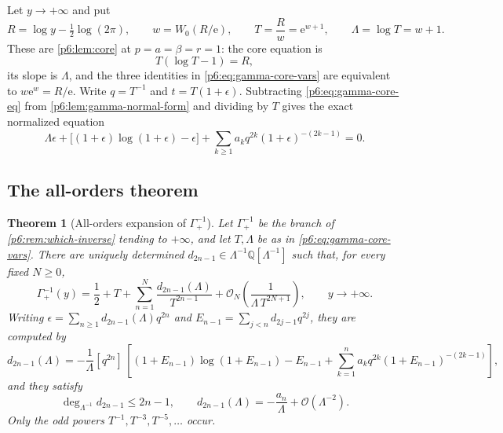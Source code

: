 \documentclass[11pt,a4paper,oneside]{book}
\theoremstyle{plain}
\newtheorem{theorem}{Theorem}[chapter]
\theoremstyle{definition}
\theoremstyle{remark}
\newcommand{\Rat}{\mathbb{Q}}
\newcommand{\e}{\mathrm{e}}
\newcommand{\Coef}[1]{[#1]\,}
\newcommand{\bigO}{\mathcal{O}}
\newcommand{\Wlam}{W}
\begin{document}
Let $y\to+\infty$ and put
\begin{equation}\label{p6:eq:gamma-core-vars}
 R=\log y-\tfrac12\log(2\pi),
 \qquad
 w=\Wlam_0(R/\e),
 \qquad
 T=\frac Rw=\e^{w+1},
 \qquad
 \Lambda=\log T=w+1 .
\end{equation}
These are \cref{p6:lem:core} at $p=a=\beta=r=1$: the core equation is
\begin{equation}\label{p6:eq:gamma-core-eq}
 T(\log T-1)=R,
\end{equation}
its slope is $\Lambda$, and the three identities in
\eqref{p6:eq:gamma-core-vars} are equivalent to $w\e^{w}=R/\e$.  Write
$q=T^{-1}$ and $t=T(1+\epsilon)$.  Subtracting \eqref{p6:eq:gamma-core-eq}
from \cref{p6:lem:gamma-normal-form} and dividing by $T$ gives the exact
normalized equation
\begin{equation}\label{p6:eq:gamma-normalized}
 \Lambda\epsilon+\bigl[(1+\epsilon)\log(1+\epsilon)-\epsilon\bigr]
 +\sum_{k\ge1}a_kq^{2k}(1+\epsilon)^{-(2k-1)}=0 .
\end{equation}

\subsection{The all-orders theorem}

\begin{theorem}[All-orders expansion of $\Gamma_+^{-1}$]\label{p6:thm:gamma}
Let $\Gamma_+^{-1}$ be the branch of \cref{p6:rem:which-inverse} tending to
$+\infty$, and let $T,\Lambda$ be as in \eqref{p6:eq:gamma-core-vars}.  There
are uniquely determined $d_{2n-1}\in\Lambda^{-1}\Rat[\Lambda^{-1}]$ such that,
for every fixed $N\ge0$,
\begin{equation}\label{p6:eq:gamma-main}
 \Gamma_+^{-1}(y)
 =\frac12+T+\sum_{n=1}^{N}\frac{d_{2n-1}(\Lambda)}{T^{2n-1}}
 +\bigO_N\!\left(\frac1{\Lambda\,T^{2N+1}}\right),
 \qquad y\to+\infty .
\end{equation}
Writing $\epsilon=\sum_{n\ge1}d_{2n-1}(\Lambda)q^{2n}$ and
$E_{n-1}=\sum_{j<n}d_{2j-1}q^{2j}$, they are computed by
\begin{equation}\label{p6:eq:gamma-recurrence}
 d_{2n-1}(\Lambda)=-\frac1\Lambda\Coef{q^{2n}}
 \left[(1+E_{n-1})\log(1+E_{n-1})-E_{n-1}
 +\sum_{k=1}^{n}a_kq^{2k}(1+E_{n-1})^{-(2k-1)}\right],
\end{equation}
and they satisfy
\begin{equation}\label{p6:eq:gamma-degree}
 \deg_{\Lambda^{-1}}d_{2n-1}\le2n-1,
 \qquad
 d_{2n-1}(\Lambda)=-\frac{a_n}{\Lambda}+\bigO(\Lambda^{-2}).
\end{equation}
Only the odd powers $T^{-1},T^{-3},T^{-5},\dots$ occur.
\end{theorem}
\end{document}
